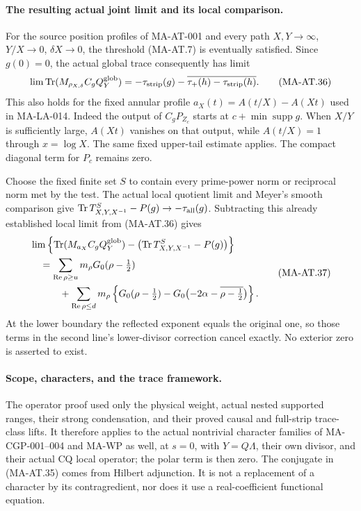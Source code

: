\paragraph{The resulting actual joint limit and its local comparison.}
For the source position profiles of MA-AT-001 and every path
\(X,Y\to\infty\), \(Y/X\to0\), \(\delta X\to0\),
the threshold (MA-AT.7) is eventually satisfied.
Since \(g(0)=0\), the actual global trace consequently has limit
\[
 \lim\operatorname{Tr}(M_{\rho_{X,\delta}}C_gQ_Y^{\rm glob})
   =-\tau_{\rm strip}(g)
        -\overline{\tau_+(h)-\tau_{\rm strip}(h)}.
 \tag{MA-AT.36}
\]
This also holds for the fixed annular profile
\(a_X(t)=A(t/X)-A(Xt)\) used in MA-LA-014.
Indeed the output of \(C_gP_{Z_c}\) starts at
\(c+\min\operatorname{supp}g\).  When \(X/Y\) is sufficiently
large, \(A(Xt)\) vanishes on that output, while \(A(t/X)=1\)
through \(x=\log X\).  The same fixed upper-tail estimate applies.
The compact diagonal term for \(P_c\) remains zero.

Choose the fixed finite set \(S\) to contain every prime-power
norm or reciprocal norm met by the test.  The actual local
quotient limit and Meyer's smooth comparison give
\(\operatorname{Tr}T^S_{X,Y,X^{-1}}-P(g)\to-\tau_{\rm all}(g)\).
Subtracting this already established local limit from (MA-AT.36)
gives
\[
 \begin{split}
 &\lim\left\{\operatorname{Tr}(M_{a_X}C_gQ_Y^{\rm glob})
       -\bigl(\operatorname{Tr}T^S_{X,Y,X^{-1}}-P(g)\bigr)\right\}\\
 &\quad=
   \sum_{\operatorname{Re}\rho\ge u}
       m_\rho G_0(\rho-\tfrac12)\\
 &\qquad\quad+
   \sum_{\operatorname{Re}\rho\le d}m_\rho
       \left\{G_0(\rho-\tfrac12)
         -G_0\bigl(-2\alpha-\overline{\rho-\tfrac12}\bigr)\right\}.
 \end{split}
 \tag{MA-AT.37}
\]
At the lower boundary the reflected exponent equals the original
one, so those terms in the second line's lower-divisor correction
cancel exactly.  No exterior zero is asserted to exist.

\paragraph{Scope, characters, and the trace framework.}
The operator proof used only the physical weight, actual nested
supported ranges, their strong condensation, and their proved
causal and full-strip trace-class lifts.
It therefore applies to the actual nontrivial character families
of MA-CGP-001--004 and MA-WP as well, at \(s=0\), with
\(Y=Q\Lambda\), their own divisor, and their actual CQ local
operator; the polar term is then zero.
The conjugate in (MA-AT.35) comes from Hilbert adjunction.
It is not a replacement of a character by its contragredient,
nor does it use a real-coefficient functional equation.

